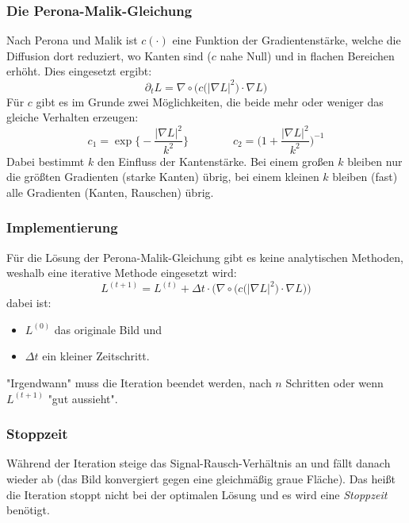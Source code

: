 				\subsubsection{Die Perona-Malik-Gleichung}
					Nach Perona und Malik ist \( c(\cdot) \) eine Funktion der Gradientenstärke, welche die Diffusion dort reduziert, wo Kanten sind (\(c\) nahe Null) und in flachen Bereichen erhöht. Dies eingesetzt ergibt:
					\begin{equation*}
						\partial_t L = \nabla \circ \Big( c\big( \lvert \nabla L \rvert^2 \big) \cdot \nabla L \Big)
					\end{equation*}
					Für \(c\) gibt es im Grunde zwei Möglichkeiten, die beide mehr oder weniger das gleiche Verhalten erzeugen:
					\begin{equation*}
						c_1 = \exp \Bigg\{ -\frac{\lvert \nabla L \rvert^2}{k^2} \Bigg\} \quad\quad\quad\quad c_2 = \Bigg( 1 + \frac{\lvert \nabla L \rvert^2}{k^2} \Bigg)^{-1}
					\end{equation*}
					Dabei bestimmt \(k\) den Einfluss der Kantenstärke. Bei einem großen \(k\) bleiben nur die größten Gradienten (starke Kanten) übrig, bei einem kleinen \(k\) bleiben (fast) alle Gradienten (Kanten, Rauschen) übrig.

				\subsubsection{Implementierung}
					Für die Lösung der Perona-Malik-Gleichung gibt es keine analytischen Methoden, weshalb eine iterative Methode eingesetzt wird:
					\begin{equation*}
						L^{(t + 1)} = L^{(t)} + \Delta t \cdot \bigg( \nabla \circ \Big( c\big(\lvert \nabla L \rvert^2\big) \cdot \nabla L \Big) \bigg)
					\end{equation*}
					dabei ist:
					\begin{itemize}
						\item \( L^{(0)} \) das originale Bild und
						\item \( \Delta t \) ein kleiner Zeitschritt.
					\end{itemize}
					"Irgendwann" muss die Iteration beendet werden, \zB nach \(n\) Schritten oder wenn \( L^{(t + 1)} \) "gut aussieht".

				\subsubsection{Stoppzeit}
					Während der Iteration steige das Signal-Rausch-Verhältnis \iA an und fällt danach wieder ab (das Bild konvergiert gegen eine gleichmäßig graue Fläche). Das heißt die Iteration stoppt nicht bei der optimalen Lösung und es wird eine \emph{Stoppzeit} benötigt.

